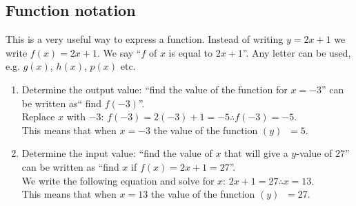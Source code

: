 \subsection*{Function notation}
This is a very useful way to express a function. Instead of writing $y=2x+1$ we write $f(x) = 2x+1$. We say ``$f$ of $x$ is equal to $2x+1$''. Any letter can be used, e.g. $g(x)$, $h(x)$, $p(x)$ etc. 
\begin{enumerate}[noitemsep, label=\textbf{\arabic*}. ] 
 \item Determine the output value: ``find the value of the function for $x=-3$'' can be written as`` find $f(-3)$''.
\\Replace $x$ with $-3$: $f(-3)=2(-3)+1=-5 \therefore f(-3)=-5$. \\
This means that when $x=-3$ the value of the function $(y)$ $~=5$.
\item Determine the input value: ``find the value of $x$ that will give a $y$-value of $27$'' can be written as ``find $x$ if $f(x)=2x+1 = 27$''. \\
We write the following equation and solve for $x$: $2x+1 = 27 \therefore x=13$.\\
This means that when $x=13$ the value of the function $(y)$ $~=27$.

\end{enumerate}


